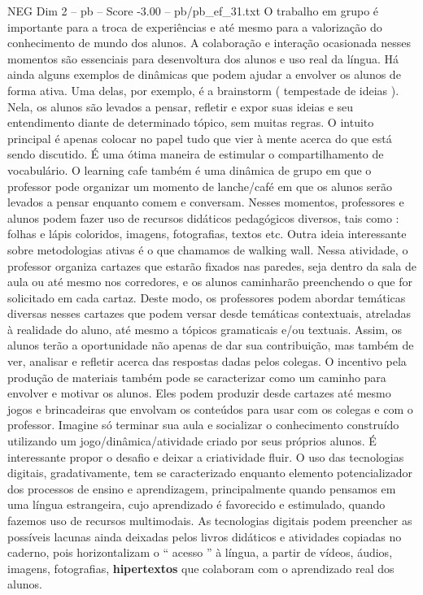 \begin{textsample}{NEG Dim 2 – pb – Score -3.00 – pb/pb\_ef\_31.txt}
O trabalho em grupo é importante para a troca de experiências e até mesmo para a valorização do conhecimento de mundo dos alunos.
A colaboração e interação ocasionada nesses momentos são essenciais para desenvoltura dos alunos e uso real da língua.
Há ainda alguns exemplos de dinâmicas que podem ajudar a envolver os alunos de forma ativa.
Uma delas, por exemplo, é a brainstorm ( tempestade de ideias ).
Nela, os alunos são levados a pensar, refletir e expor suas ideias e seu entendimento diante de determinado tópico, sem muitas regras.
O intuito principal é apenas colocar no papel tudo que vier à mente acerca do que está sendo discutido.
É uma ótima maneira de estimular o compartilhamento de vocabulário.
O learning cafe também é uma dinâmica de grupo em que o professor pode organizar um momento de lanche/café em que os alunos serão levados a pensar enquanto comem e conversam.
Nesses momentos, professores e alunos podem fazer uso de recursos didáticos pedagógicos diversos, tais como : folhas e lápis coloridos, imagens, fotografias, textos etc.
Outra ideia interessante sobre metodologias ativas é o que chamamos de walking wall.
Nessa atividade, o professor organiza cartazes que estarão fixados nas paredes, seja dentro da sala de aula ou até mesmo nos corredores, e os alunos caminharão preenchendo o que for solicitado em cada cartaz.
Deste modo, os professores podem abordar temáticas diversas nesses cartazes que podem versar desde temáticas contextuais, atreladas à realidade do aluno, até mesmo a tópicos gramaticais e/ou textuais.
Assim, os alunos terão a oportunidade não apenas de dar sua contribuição, mas também de ver, analisar e refletir acerca das respostas dadas pelos colegas.
O incentivo pela produção de materiais também pode se caracterizar como um caminho para envolver e motivar os alunos.
Eles podem produzir desde cartazes até mesmo jogos e brincadeiras que envolvam os conteúdos para usar com os colegas e com o professor.
Imagine só terminar sua aula e socializar o conhecimento construído utilizando um jogo/dinâmica/atividade criado por seus próprios alunos.
É interessante propor o desafio e deixar a criatividade fluir.
O uso das tecnologias digitais, gradativamente, tem se caracterizado enquanto elemento potencializador dos processos de ensino e aprendizagem, principalmente quando pensamos em uma língua estrangeira, cujo aprendizado é favorecido e estimulado, quando fazemos uso de recursos multimodais.
As tecnologias digitais podem preencher as possíveis lacunas ainda deixadas pelos livros didáticos e atividades copiadas no caderno, pois horizontalizam o “ acesso ” à língua, a partir de vídeos, áudios, imagens, fotografias, \textbf{hipertextos} que colaboram com o aprendizado real dos alunos.

\end{textsample}
